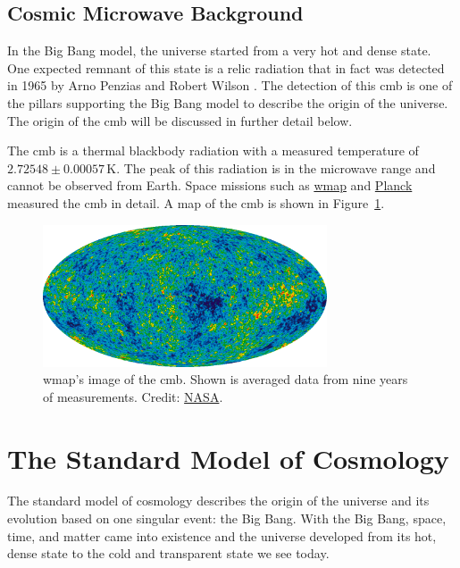 \subsection{Cosmic Microwave Background}

In the Big Bang model, the universe started from a very hot and dense state. One expected remnant of this state is a relic radiation that in fact was detected in 1965 by Arno Penzias and Robert Wilson \citep{penzias65}. The detection of this \ac{cmb} is one of the pillars supporting the Big Bang model to describe the origin of the universe. The origin of the \ac{cmb} will be discussed in further detail below.

The \ac{cmb} is a thermal blackbody radiation with a measured temperature of $2.72548 \pm 0.00057$\,K. The peak of this radiation is in the microwave range and cannot be observed from Earth. Space missions such as \href{https://map.gsfc.nasa.gov/}{\ac{wmap}} and \href{http://www.esa.int/Science_Exploration/Space_Science/Planck}{Planck} measured the \ac{cmb} in detail. A map of the \ac{cmb} is shown in Figure~\ref{fig:bbn:wmap_cmb}.
\begin{figure}[tb]
    \centering
    \includegraphics[width=0.75\textwidth]{graphics/bbn/wmap_cmb}
    \caption{\ac{wmap}'s image of the \ac{cmb}. Shown is averaged data from nine years of measurements. Credit: \href{https://map.gsfc.nasa.gov/media/121238/index.html}{NASA}.}
    \label{fig:bbn:wmap_cmb}
\end{figure}



\section{The Standard Model of Cosmology}

The standard model of cosmology describes the origin of the universe and its evolution based on one singular event: the Big Bang. With the Big Bang, space, time, and matter came into existence and the universe developed from its hot, dense state to the cold and transparent state we see today.

